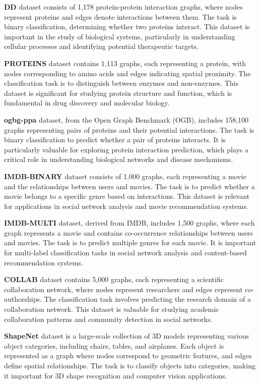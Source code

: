 \textbf{DD} \cite{DD} dataset consists of 1,178 protein-protein interaction graphs, where nodes represent proteins and edges denote interactions between them. The task is binary classification, determining whether two proteins interact. This dataset is important in the study of biological systems, particularly in understanding cellular processes and identifying potential therapeutic targets.

\textbf{PROTEINS} \cite{PROTEINS} dataset contains 1,113 graphs, each representing a protein, with nodes corresponding to amino acids and edges indicating spatial proximity. The classification task is to distinguish between enzymes and non-enzymes. This dataset is significant for studying protein structure and function, which is fundamental in drug discovery and molecular biology.

\textbf{ogbg-ppa} \cite{hu2020ogb} dataset, from the Open Graph Benchmark (OGB), includes 158,100 graphs representing pairs of proteins and their potential interactions. The task is binary classification to predict whether a pair of proteins interacts. It is particularly valuable for exploring protein interaction prediction, which plays a critical role in understanding biological networks and disease mechanisms.

\textbf{IMDB-BINARY} \cite{IMDB} dataset consists of 1,000 graphs, each representing a movie and the relationships between users and movies. The task is to predict whether a movie belongs to a specific genre based on interactions. This dataset is relevant for applications in social network analysis and movie recommendation systems.

\textbf{IMDB-MULTI} \cite{IMDB} dataset, derived from IMDB, includes 1,500 graphs, where each graph represents a movie and contains co-occurrence relationships between users and movies. The task is to predict multiple genres for each movie. It is important for multi-label classification tasks in social network analysis and content-based recommendation systems.

\textbf{COLLAB} \cite{COLLAB} dataset contains 5,000 graphs, each representing a scientific collaboration network, where nodes represent researchers and edges represent co-authorships. The classification task involves predicting the research domain of a collaboration network. This dataset is valuable for studying academic collaboration patterns and community detection in social networks.


\textbf{ShapeNet} \cite{ShapeNet} dataset is a large-scale collection of 3D models representing various object categories, including chairs, tables, and airplanes. Each object is represented as a graph where nodes correspond to geometric features, and edges define spatial relationships. The task is to classify objects into categories, making it important for 3D shape recognition and computer vision applications.

